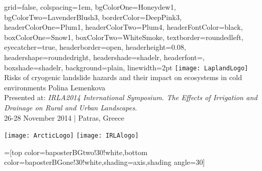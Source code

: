 \documentclass[a0paper,landscape,final,fontscale=0.35]{baposter}
\begin{document}


\begin{poster}{
  grid=false,
  colspacing=1em,
  bgColorOne=Honeydew1,%
  bgColorTwo=LavenderBlush3,
  borderColor=DeepPink3,
  headerColorOne=Plum1,%
  headerColorTwo=Plum4,%
  headerFontColor=black,
  boxColorOne=Snow1,
  boxColorTwo=WhiteSmoke,
  textborder=roundedleft,
  eyecatcher=true,
  headerborder=open,
  headerheight=0.08\textheight,
  headershape=roundedright,
  headershade=shadelr,
  headerfont=\Large\textsf, %
  boxshade=shadelr,
  background=plain,
  linewidth=2pt
  }
  {
   \texttt{[image: LaplandLogo]}
  } %
  {\sf %
\Large{Risks of cryogenic landslide hazards and their impact on ecosystems in cold environments}}
  {\sf %
Polina Lemenkova\hspace{3em}\\
\normalsize{Presented at: 
\emph{IRLA2014 International Symposium. The Effects of Irrigation and Drainage on Rural and Urban Landscapes}.\\
 26-28 November 2014 | Patras, Greece
 }
}
{{\begin{minipage}{20em}
    \hfill
    \texttt{[image: ArcticLogo]}%
    \texttt{[image: IRLAlogo]}
  \end{minipage}}
  }

  =[top color=baposterBGtwo!30!white,bottom color=baposterBGone!30!white,shading=axis,shading angle=30]

     \newlength{\leftimgwidth}
     \setlength{\leftimgwidth}{0.78em+8.0em}


\end{poster}
\end{document}
